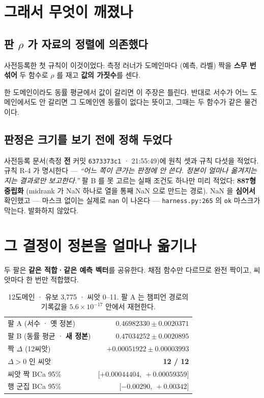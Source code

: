 \documentclass[10pt]{article}
\begin{document}
\section{그래서 무엇이 깨졌나}

\subsection{판 $\rho$ 가 자료의 정렬에 의존했다}

사전등록한 첫 규칙이 이것이었다: 측정 러너가 도메인마다 (예측, 라벨) 짝을
\textbf{스무 번 섞어} 두 함수로 $\rho$ 를 재고 \textbf{값의 가짓수}를 센다.

{한 도메인이라도 동률 평균에서 값이 갈리면 이 주장은 틀린다. 반대로 서수가
어느 도메인에서도 안 갈리면 그 도메인엔 동률이 없다는 뜻이고, 그때는
두 함수가 같은 물건이다.}

\subsection{판정은 크기를 보기 전에 정해 두었다}

사전등록 문서(측정 \textbf{전} 커밋 \texttt{6373373c1} · 21:55:49)에 원칙 셋과
규칙 다섯을 적었다. 규칙 R-4 가 명시한다 --- \emph{``어느 쪽이 큰가는 판정에
안 쓴다. 정본이 얼마나 옮겨지는지는 결과로만 보고한다.''}
팔 B 를 못 고르는 실패 조건도 하나만 미리 적었다: \textbf{887형 중립화}
(midrank 가 NaN 하나로 열을 통째 NaN 으로 만드는 경로). NaN 을 \textbf{심어서}
확인했고 --- 마스크 없이는 실제로 \texttt{nan} 이 나온다 ---
\texttt{harness.py:265} 의 \texttt{ok} 마스크가 막는다. 발화하지 않았다.

\section{그 결정이 정본을 얼마나 옮기나}

두 팔은 \textbf{같은 적합·같은 예측 벡터}를 공유한다. 채점 함수만 다르므로
완전 짝이고, 씨앗마다 한 번만 적합했다.

\begin{table}[t]\centering\small
\begin{tabular}{lr}
\hline
팔 A (서수 · 옛 정본) & $0.46982330 \pm 0.0020371$ \\
팔 B (동률 평균 · \textbf{새 정본}) & $\mathbf{0.47034252} \pm 0.0020895$ \\
\hline
짝 $\Delta$ (12씨앗) & $+0.00051922 \pm 0.00003993$ \\
$\Delta>0$ 인 씨앗 & \textbf{12 / 12} \\
씨앗 짝 BCa 95\% & $\lbrack+0.00044404,\ +0.00059359\rbrack$ \\
행 군집 BCa 95\% & $\lbrack-0.00290,\ +0.00342\rbrack$ \\
\hline
\end{tabular}
\caption{12도메인 · 유보 3,775 · 씨앗 0--11. 팔 A 는 챔피언 경로의 기록값을
$5.6\times10^{-17}$ 안에서 재현한다.}
\label{tab:board}
\end{table}
\end{document}
